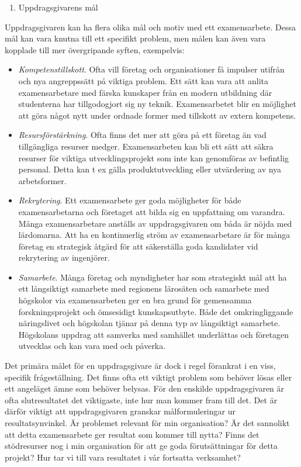 \begin{enumerate}
\def\labelenumi{\arabic{enumi}.}
\item
  Uppdragsgivarens mål
\end{enumerate}

Uppdragsgivaren kan ha flera olika mål och motiv med ett examensarbete.
Dessa mål kan vara knutna till ett specifikt problem, men målen kan även
vara kopplade till mer övergripande syften, exempelvis:

\begin{itemize}
\item
  \emph{Kompetenstillskott}. Ofta vill företag och organisationer få
  impulser utifrån och nya angreppssätt på viktiga problem. Ett sätt kan
  vara att anlita examensarbetare med färska kunskaper från en modern
  utbildning där studenterna har tillgodogjort sig ny teknik.
  Examensarbetet blir en möjlighet att göra något nytt under ordnade
  former med tillskott av extern kompetens.
\item
  \emph{Resursförstärkning}. Ofta finns det mer att göra på ett företag
  än vad tillgängliga resurser medger. Examensarbeten kan bli ett sätt
  att säkra resurser för viktiga utvecklingsprojekt som inte kan
  genomföras av befintlig personal. Detta kan t ex gälla
  produktutveckling eller utvärdering av nya arbetsformer.
\item
  \emph{Rekrytering}. Ett examensarbete ger goda möjligheter för både
  examensarbetarna och företaget att bilda sig en uppfattning om
  varandra. Många examensarbetare anställs av uppdragsgivaren om båda är
  nöjda med lärdomarna. Att ha en kontinuerlig ström av examensarbetare
  är för många företag en strategisk åtgärd för att säkerställa goda
  kandidater vid rekrytering av ingenjörer.
\item
  \emph{Samarbete}. Många företag och myndigheter har som strategiskt
  mål att ha ett långsiktigt samarbete med regionens lärosäten och
  samarbete med högskolor via examensarbeten ger en bra grund för
  gemensamma forskningsprojekt och ömsesidigt kunskapsutbyte. Både det
  omkringliggande näringslivet och högskolan tjänar på denna typ av
  långsiktigt samarbete. Högskolans uppdrag att samverka med samhället
  underlättas och företagen utvecklas och kan vara med och påverka.
\end{itemize}

Det primära målet för en uppdragsgivare är dock i regel förankrat i en
viss, specifik frågeställning. Det finns ofta ett viktigt problem som
behöver lösas eller ett angeläget ämne som behöver belysas. För den
enskilde uppdragsgivaren är ofta slutresultatet det viktigaste, inte hur
man kommer fram till det. Det är därför viktigt att uppdragsgivaren
granskar målformuleringar ur resultatsynvinkel. Är problemet relevant
för min organisation? Är det sannolikt att detta examensarbete ger
resultat som kommer till nytta? Finns det stödresurser nog i min
organisation för att ge goda förutsättningar för detta projekt? Hur tar
vi till vara resultatet i vår fortsatta verksamhet?

